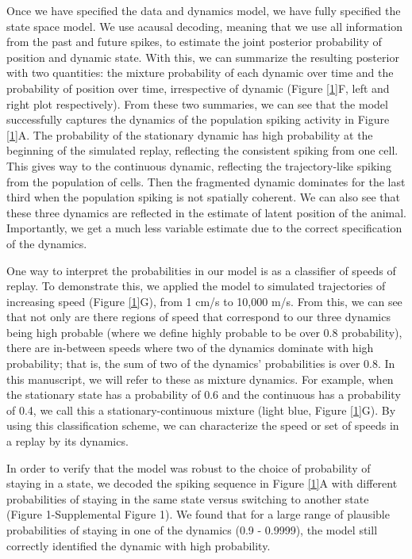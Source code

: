 \documentclass[times, twoside]{zHenriquesLab-StyleBioRxiv}
\begin{document}
Once we have specified the data and dynamics model, we have fully specified the state space model. We use acausal decoding, meaning that we use all information from the past and future spikes, to estimate the joint posterior probability of position and dynamic state. With this, we can summarize the resulting posterior with two quantities: the mixture probability of each dynamic over time and the probability of position over time, irrespective of dynamic (Figure \ref{1}F, left and right plot respectively). From these two summaries, we can see that the model successfully captures the dynamics of the population spiking activity in Figure \ref{1}A. The probability of the stationary dynamic has high probability at the beginning of the simulated replay, reflecting the consistent spiking from one cell. This gives way to the continuous dynamic, reflecting the trajectory-like spiking from the population of cells. Then the fragmented dynamic dominates for the last third when the population spiking is not spatially coherent. We can also see that these three dynamics are reflected in the estimate of latent position of the animal.  Importantly, we get a much less variable estimate due to the correct specification of the dynamics.

One way to interpret the probabilities in our model is as a classifier of speeds of replay. To demonstrate this, we applied the model to simulated trajectories of increasing speed (Figure \ref{1}G), from 1 cm/s to 10,000 m/s. From this, we can see that not only are there regions of speed that correspond to our three dynamics being high probable (where we define highly probable to be over 0.8 probability), there are in-between speeds where two of the dynamics dominate with high probability; that is, the sum of two of the dynamics' probabilities is over 0.8. In this manuscript, we will refer to these as mixture dynamics. For example, when the stationary state has a probability of 0.6 and the continuous has a probability of 0.4, we call this a stationary-continuous mixture (light blue, Figure \ref{1}G). By using this classification scheme, we can characterize the speed or set of speeds in a replay by its dynamics.

In order to verify that the model was robust to the choice of probability of staying in a state, we decoded the spiking sequence in Figure \ref{1}A with different probabilities of staying in the same state versus switching to another state (Figure 1-Supplemental Figure 1). We found that for a large range of plausible probabilities of staying in one of the dynamics (0.9 - 0.9999), the model still correctly identified the dynamic with high probability.
\end{document}
